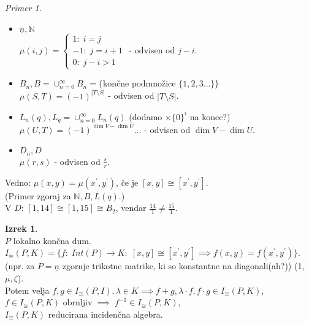 \documentclass[a4paper, 12pt]{book}
\theoremstyle{definition}
\newtheorem{theorem}[counter]{Izrek}
\theoremstyle{remark}
\newtheorem*{ex}{Primer}
\newcommand{\N}{\mathbb{N}}
\begin{document}
\begin{ex} \text{} \\
  \begin{itemize}
    \item $\underline{n}, \N$ \\
      $\mu(i, j) = \begin{cases}1: \; i=j \\ -1: \; j = i+1 \\ 0: \; j-i > 1\end{cases}$ - odvisen od $j-i$.
    \item $B_n, B = \cup_{n=0}^{\infty} B_n = \{\text{končne podmnožice } \{1, 2, 3 \dots\}\}$ \\
      $\mu(S, T) = (-1)^{|T \setminus S|}$ - odvisen od $|T \setminus S|$.
    \item $L_n(q), L_q = \cup_{n=0}^{\infty} L_n(q)$ (dodamo $\times \{0\}^i$ na konec?) \\
      $\mu(U, T) = (-1)^{\dim V - \dim U} \dots$ - odvisen od $\dim V - \dim U$.
    \item $D_n, D$ \\
      $\mu(r, s)$ - odvisen od $\frac{s}{r}$.
  \end{itemize}
\end{ex}
Vedno: $\mu(x, y) = \mu(x^{'}, y^{'})$, če je $[x, y] \cong [x^{'}, y^{'}]$. \\
(Primer zgoraj za $\N, B, L(q)$.) \\
V $D$: $[1, 14] \cong [1, 15] \cong B_2$, vendar $\frac{14}{1} \neq \frac{15}{1}$.
\begin{theorem} \text{} \\
  $P$ lokalno končna dum. \\
  $I_{\cong}(P, K) = \{f: \; Int(P) \to K: \; [x,y] \cong [x^{'}, y^{'}] \implies f(x,y) = f(x^{'},y^{'})\}$. \\
  (npr. za $P = \underline{n}$ zgornje trikotne matrike, ki so konstantne na diagonali(ah?)) (1, $\mu, \zeta$). \\
  Potem velja $f, g \in I_{\cong}(P, I), \lambda \in K \implies
  f + g, \lambda \cdot f, f \cdot g \in I_{\cong}(P, K)$, \\
  $f \in I_{\cong}(P, K)$ obrnljiv $\implies \; f^{-1} \in I_{\cong}(P, K)$, \\
  $I_{\cong}(P, K)$ reducirana incidenčna algebra.
\end{theorem}
\end{document}

